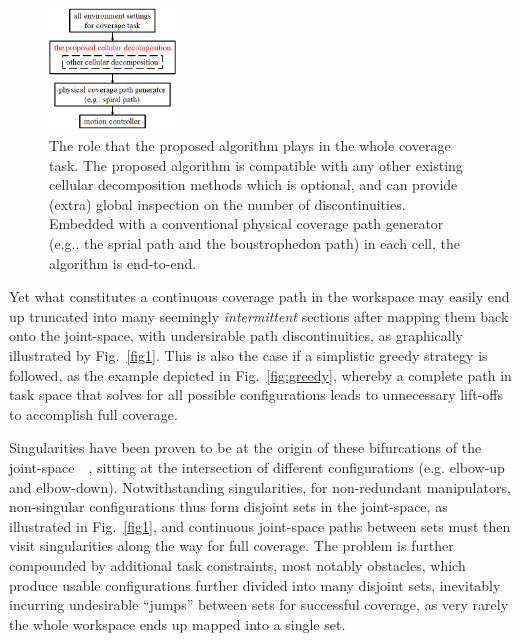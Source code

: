 \documentclass[journal]{IEEEtran}
\begin{document}
\begin{figure}[t]
\centering
\includegraphics[width = 0.3\textwidth]{figures/other_figures/relation}
\caption{The role that the proposed algorithm plays in the whole coverage task. The proposed algorithm is compatible with any other existing cellular decomposition methods which is optional, and can provide (extra) global inspection on the number of discontinuities. Embedded with a conventional physical coverage path generator (e.g., the sprial path and the boustrophedon path) in each cell, the algorithm is end-to-end. }
\end{figure}

\newpage
Yet what constitutes a continuous coverage path in the workspace may easily end up truncated into many seemingly \textit{intermittent} sections after mapping them back onto the joint-space, with undersirable path discontinuities, as graphically illustrated by Fig.~\ref{fig1}. This is also the case if a simplistic greedy strategy is followed, as the example depicted in Fig.~\ref{fig:greedy}, whereby a complete path in task space that solves for all possible configurations leads to unnecessary lift-offs to accomplish full coverage. 

Singularities have been proven to be at the origin of these bifurcations of the joint-space~\cite{porta2010path}~\cite{Porta2012Randomized}, sitting at the intersection of different configurations (e.g. elbow-up and elbow-down).
Notwithstanding singularities, for non-redundant manipulators, non-singular configurations thus form disjoint sets in the joint-space, as illustrated in Fig.~\ref{fig1}, and continuous joint-space paths between sets must then visit singularities along the way for full coverage. The problem is further compounded by additional task constraints, most notably obstacles, which produce usable configurations further divided into many disjoint sets, inevitably incurring undesirable ``jumps'' between sets for successful coverage, as very rarely the whole workspace ends up mapped into a single set.  
\end{document}
